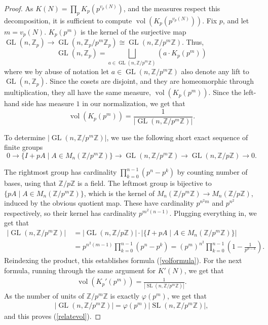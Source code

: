 \documentclass[10pt,a4paper]{amsart}
\newcommand{\GL}{\operatorname{GL}}
\newcommand{\SL}{\operatorname{SL}}
\newcommand{\Z}{\mathbb{Z}}
\newcommand{\vol}{\operatorname{vol}}
\renewcommand{\phi}{\varphi}
\begin{document}
\begin{proof}
As $K(N) = \prod_p K_p(p^{v_p(N)})$, and the measures respect this decomposition, it is sufficient to compute $\vol(K_p(p^{v_p(N)}))$. Fix $p$, and let $m=v_p(N)$. $K_p(p^m)$ is the kernel of the surjective map $\GL(n,\Z_p)\to\GL(n,\Z_p/p^m\Z_p)\cong \GL(n,\Z/p^m\Z)$. Thus,
$$\GL(n,\Z_p)=\bigsqcup_{a\in\GL(n,\Z/p^m\Z)}(a\cdot K_p(p^m))$$
where we by abuse of notation let $a\in\GL(n,\Z/p^m\Z)$ also denote any lift to $\GL(n,\Z_p)$. Since the cosets are disjoint, and they are homeomorphic through multiplication, they all have the same measure, $\vol(K_p(p^m))$. Since the left-hand side has measure $1$ in our normalization, we get that 
$$\vol(K_p(p^m))=\frac{1}{|\GL(n,\Z/p^m\Z)|}.$$

\noindent To determine $|\GL(n,\Z/p^m\Z)|$, we use the following short exact sequence of finite groups
$$0\to\lbrace I+pA\mid A\in M_n(\Z/p^m\Z)\rbrace\to \GL(n,\Z/p^m\Z)\to \GL(n,\Z/p\Z)\to 0.$$

\noindent The rightmost group has cardinality $\prod_{k=0}^{n-1}(p^n-p^k)$ by counting number of bases, using that $\Z/p\Z$ is a field. The leftmost group is bijective to $\lbrace pA\mid A\in M_n(\Z/p^m\Z)\rbrace$, which is the kernel of $M_n(\Z/p^m\Z)\to M_n(\Z/p\Z)$, induced by the obvious quotient map. These have cardinality $p^{n^2m}$ and $p^{n^2}$ respectively, so their kernel has cardinality $p^{m^2(n-1)}$. Plugging everything in, we get that
\begin{align}\label{localvol}
 |\GL(n,\Z/p^m\Z)|\:&= |\GL(n,\Z/p\Z)|\cdot |\lbrace I+pA\mid A\in M_n(\Z/p^m\Z)\rbrace| \\
&= p^{n^2(m-1)}\prod_{k=0}^{n-1}(p^n-p^k) = (p^{m})^{n^2}\prod_{k=0}^{n-1}\left(1-\frac{1}{p^{n-k}}\right).
\end{align}
Reindexing the product, this establishes formula (\ref{volformula}). For the next formula, running through the same argument for $K'(N)$, we get that
\begin{align}\label{SLnlocalvol}
    \vol(K_p'(p^{m})) = \frac{1}{|\SL(n,\Z/p^m\Z)|}.
\end{align}
As the number of units of $\Z/p^m\Z$ is exactly $\phi(p^m)$, we get that 
\begin{align*}
    |\GL(n,\Z/p^m\Z)| = \phi(p^m) |\SL(n,\Z/p^m\Z)|,
\end{align*}
and this proves (\ref{relatevol}). 


\end{proof}
\end{document}
